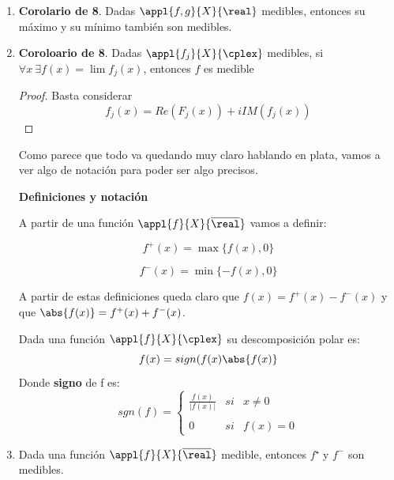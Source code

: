 \documentclass{apuntes}
\begin{document}
\begin{enumerate}
\begin{proof}
\begin{enumerate}
\item $g_2(x) = - \sup\{f_j(x)\}$

\item $g_3(x) = \limsup f_j(x) = \lim_n \sup_{j \geq n}\{f_j(x)\}=\inf_n \sup_{j \geq n}\{f_j(x)\}$ es medible
\end{enumerate}
\end{proof}
\item \textbf{Corolario de 8}. Dadas $\appl{f,g}{X}{\real}$ medibles, entonces su máximo y su mínimo también son medibles.

\item \textbf{Coroloario de 8}. Dadas $\appl{f_j}{X}{\cplex}$ medibles, si $\forall x \ \exists f(x)=\lim f_j(x)$, entonces $f$ es medible
\begin{proof}
Basta considerar
\[f_j(x) = Re(F_j(x))+ i IM(f_j(x))\]
\end{proof}

Como parece que todo va quedando muy claro hablando en plata, vamos a ver algo de notación para poder ser algo precisos.

\textbf{Definiciones y notación}

A partir de una función $\appl{f}{X}{\overline{\real}}$ vamos a definir:

\begin{defn}[.$f^+(x)$]
\[f^+(x)=\max \{f(x), 0\}\]
\end{defn}

\begin{defn}[.$f^-(x)$]
\[f^-(x)=\min \{-f(x), 0\}\]
\end{defn}

A partir de estas definiciones queda claro que $f(x)=f^+(x)-f^-(x)$ y que $\abs{f(x)}=f^+(x)+f^-(x)$.

\begin{defn}
Dada una función $\appl{f}{X}{\cplex}$ su descomposición polar es:
\[f(x)=sign(f(x)\abs{f(x)}\]
Donde \textbf{signo} de f es:
\[sgn(f)=\left\{ \begin{array}{lcc}
             \frac{f(x)}{|f(x)|} &   si  & x \neq 0 \\
             \\ 0 &  si  & f(x) = 0
             \end{array}
   \right.\]
\end{defn}

\item Dada una función $\appl{f}{X}{\overline{\real}}$ medible, entonces $f⁺$ y $f^-$ son medibles.


\end{enumerate}
\end{document}
